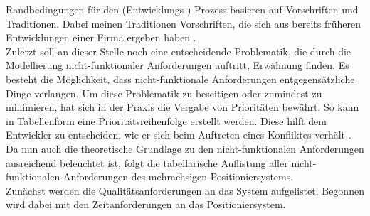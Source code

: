 \documentclass[../../../Bachelorarbeit.tex]{subfiles}
\begin{document}
Randbedingungen für den (Entwicklungs-) Prozess basieren auf Vorschriften und Traditionen. Dabei meinen Traditionen Vorschriften, die sich aus bereits früheren Entwicklungen einer Firma ergeben haben \cite[46]{Walke2005}.\\
Zuletzt soll an dieser Stelle noch eine entscheidende Problematik, die durch die Modellierung nicht-funktionaler Anforderungen auftritt, Erwähnung finden. Es besteht die Möglichkeit, dass nicht-funktionale Anforderungen entgegensätzliche Dinge verlangen. Um diese Problematik zu beseitigen oder zumindest zu minimieren, hat sich in der Praxis die Vergabe von Prioritäten bewährt. So kann in Tabellenform eine Prioritätsreihenfolge erstellt werden. Diese hilft dem Entwickler zu entscheiden, wie er sich beim Auftreten eines Konfliktes verhält \cite[33]{Laplante2014}.\\
Da nun auch die theoretische Grundlage zu den nicht-funktionalen Anforderungen ausreichend beleuchtet ist, folgt die tabellarische Auflistung aller nicht-funktionalen Anforderungen des mehrachsigen Positioniersystems.\\ 
\newline
Zunächst werden die Qualitätsanforderungen an das System aufgelistet. Begonnen wird dabei mit den Zeitanforderungen an das Positioniersystem.
\end{document}
